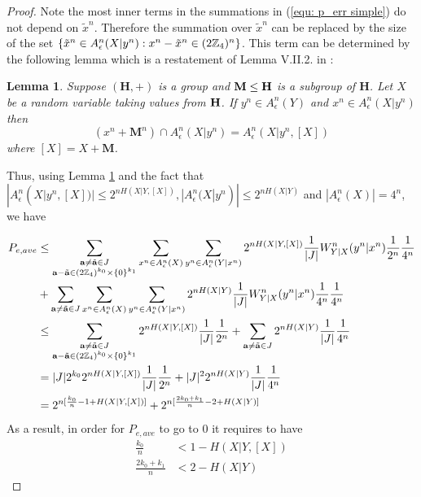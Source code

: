 \documentclass[conference]{IEEEtran}
\theoremstyle{plain}
\newtheorem{lem}{Lemma}
\theoremstyle{definition}
\theoremstyle{remark}
\begin{document}
\begin{proof}
Note the most inner terms in the summations in (\ref{equ: p_err simple}) do not depend on $\tilde{x}^n$. Therefore the summation over $\tilde{x}^n$ can be replaced by the size of the set $\{\tilde{x}^n\in A_\epsilon^n(X|y^n): x^n-\tilde{x}^n \in (2\mathbb{Z}_4)^n\}$. This term can be determined by the following lemma which is a restatement of Lemma V.II.2. in \cite{Aria-group}:
\begin{lem}\label{lem: Subgroup_typicality}
Suppose $(\mathbf{H},+)$ is a group and $\bf M \leq H$ is a subgroup of $\mathbf{H}$. Let $X$ be a random variable taking values from $\bf H$. If $y^n \in A_{\epsilon}^n(Y)$ and $x^n \in A_{\epsilon}^n (X|y^n)$ then 
\begin{equation*}
(x^n+\mathbf{M}^n) \cap A_{\epsilon}^n(X|y^n)=A_{\epsilon}^n(X|y^n, [X])
\end{equation*}
where $[X]=X+\mathbf{M}$.
\end{lem}


Thus, using Lemma \ref{lem: Subgroup_typicality} and the fact that $|A_{\epsilon}^n (X|y^n, [X])|\leq 2^{nH(X|Y,[X])}, |A_{\epsilon}^n (X|y^n)|\leq 2^{nH(X|Y)}$ and $|A_{\epsilon}^n(X)|=4^n$, we have

\begin{align*}
P_{e, ave} &\leq \sum_{\substack{\mathbf{a}\neq \tilde{\mathbf{a}} \in J \\\mathbf{a}-\tilde{\mathbf{a}} \in (2\mathbb{Z}_4)^{k_0}\times \{0\}^{k_1}} } \sum_{x^n\in A_\epsilon^n(X)} \sum_{y^n\in A_\epsilon^n(Y|x^n)} 2^{nH(X|Y,[X])} \frac{1}{|J|} W_{Y|X}^n(y^n|x^n) \frac{1}{2^n}\frac{1}{4^n}\\
&+\sum_{\mathbf{a}\neq \tilde{\mathbf{a}} \in J }  \sum_{x^n\in A_\epsilon^n(X)} \sum_{y^n\in A_\epsilon^n(Y|x^n)} 2^{nH(X|Y)} \frac{1}{|J|} W_{Y|X}^n(y^n|x^n) \frac{1}{4^n}\frac{1}{4^n}\\
 &\leq \sum_{\substack{\mathbf{a}\neq \tilde{\mathbf{a}} \in J \\\mathbf{a}-\tilde{\mathbf{a}} \in (2\mathbb{Z}_4)^{k_0}\times \{0\}^{k_1}} }  2^{nH(X|Y,[X])} \frac{1}{|J|} \frac{1}{2^n}+\sum_{\mathbf{a}\neq \tilde{\mathbf{a}} \in J }  2^{nH(X|Y)} \frac{1}{|J|} \frac{1}{4^n}\\
 &= |J|2^{k_0} 2^{nH(X|Y,[X])} \frac{1}{|J|} \frac{1}{2^n}+|J|^2  2^{nH(X|Y)} \frac{1}{|J|} \frac{1}{4^n}\\
 &=2^{n[\frac{k_0}{n}-1+H(X|Y,[X])]}+2^{n[\frac{2k_0+k_1}{n}-2+H(X|Y)]}
\end{align*}
As a result, in order for $P_{e, ave}$ to go to $0$ it requires to have  
\begin{align*}
\frac{k_0}{n} &< 1-H(X|Y,[X])\\
\frac{2k_0+k_1}{n} &< 2-H(X|Y)
\end{align*}


\end{proof}
\end{document}
